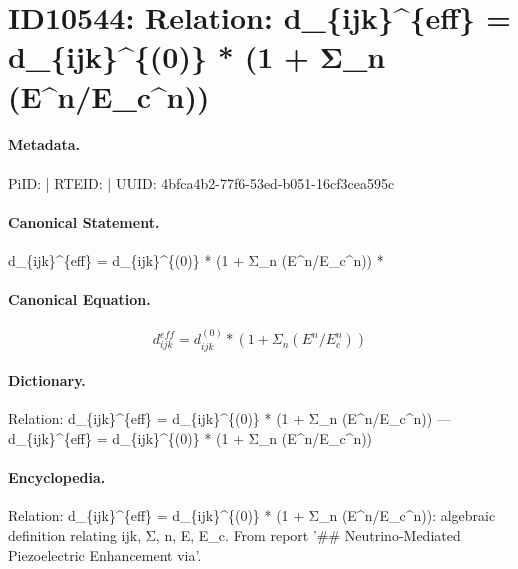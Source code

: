 \section*{ID10544: Relation: d\_\{ijk\}\textasciicircum{}\{eff\} = d\_\{ijk\}\textasciicircum{}\{(0)\} * (1 + Σ\_n (E\textasciicircum{}n/E\_c\textasciicircum{}n))}
\paragraph{Metadata.}
PiID:  | RTEID:  | UUID: 4bfca4b2-77f6-53ed-b051-16cf3cea595c

\paragraph{Canonical Statement.}
d\_\{ijk\}\textasciicircum{}\{eff\} = d\_\{ijk\}\textasciicircum{}\{(0)\} * (1 + Σ\_n (E\textasciicircum{}n/E\_c\textasciicircum{}n)) *

\paragraph{Canonical Equation.}
\[
d_{ijk}^{eff} = d_{ijk}^{(0)} * (1 + Σ_n (E^n/E_c^n))
\]

\paragraph{Dictionary.}
Relation: d\_\{ijk\}\textasciicircum{}\{eff\} = d\_\{ijk\}\textasciicircum{}\{(0)\} * (1 + Σ\_n (E\textasciicircum{}n/E\_c\textasciicircum{}n)) — d\_\{ijk\}\textasciicircum{}\{eff\} = d\_\{ijk\}\textasciicircum{}\{(0)\} * (1 + Σ\_n (E\textasciicircum{}n/E\_c\textasciicircum{}n))

\paragraph{Encyclopedia.}
Relation: d\_\{ijk\}\textasciicircum{}\{eff\} = d\_\{ijk\}\textasciicircum{}\{(0)\} * (1 + Σ\_n (E\textasciicircum{}n/E\_c\textasciicircum{}n)): algebraic definition relating ijk, Σ, n, E, E\_c. From report '\#\# Neutrino-Mediated Piezoelectric Enhancement via'.
